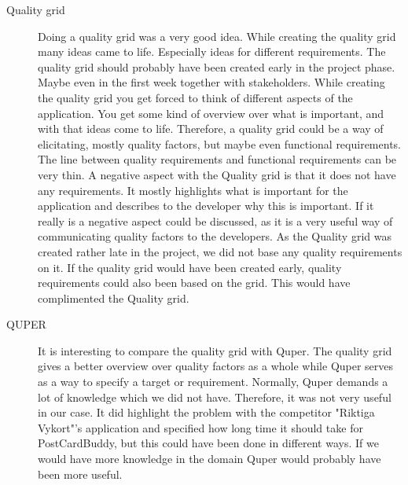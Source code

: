 \documentclass[10pt,a4paper]{article}
\begin{document}
\begin{description}
\item[Quality grid]
Doing a quality grid was a very good idea. While creating the quality grid many ideas came to life. Especially ideas for different requirements.
The quality grid should probably have been created early in the project phase. Maybe even in the first week together with stakeholders. While creating the quality grid you get forced to think of different aspects of the application. You get some kind of overview over what is important, and with that ideas come to life. Therefore, a quality grid could be a way of elicitating, mostly quality factors, but maybe even functional requirements. The line between quality requirements and functional requirements can be very thin. A negative aspect with the Quality grid is that it does not have any requirements. It mostly highlights what is important for the application and describes to the developer why this is important. If it really is a negative aspect could be discussed, as it is a very useful way of communicating quality factors to the developers. As the Quality grid was created rather late in the project, we did not base any quality requirements on it. If the quality grid would have been created early, quality requirements could also been based on the grid. This would have complimented the Quality grid.


\item[QUPER]
It is interesting to compare the quality grid with Quper. The quality grid gives a better overview over quality factors as a whole while Quper serves as a way to specify a target or requirement. Normally, Quper demands a lot of knowledge which we did not have. Therefore, it was not very useful in our case. It did highlight the problem with the competitor "Riktiga Vykort"'s application and specified how long time it should take for PostCardBuddy, but this could have been done in different ways. If we would have more knowledge in the domain Quper would probably have been more useful.


\end{description}




\end{document}

